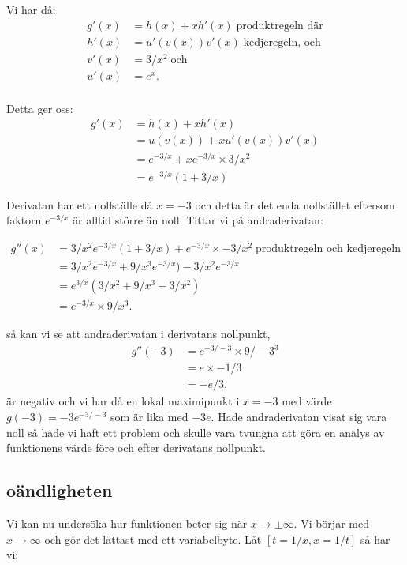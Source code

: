 \documentclass[a4paper, 11pt]{article}
\begin{document}
Vi har då:
\begin{align*}
g'(x) &= h(x) + x h'(x) \; \text{produktregeln där}\\
h'(x) &= u'(v(x)) v'(x) \; \text{kedjeregeln, och}\\
v'(x) &= 3/x^2\; \text{och}\\
u'(x) &= e^x.\\
\end{align*}

Detta ger oss:
\begin{align*}
  g'(x) & = h(x) + x h'(x)\\
  & = u(v(x)) + x u'(v(x)) v'(x) \\
  & = e^{-3/x} + x e^{-3/x}  \times 3/x^2 \\
  & = e^{-3/x}(1 + 3/x) 
\end{align*}


Derivatan har ett nollställe då $x = -3$ och detta är det enda nollstället eftersom faktorn $e^{-3/x}$ är alltid större
än noll. Tittar vi på andraderivatan:

\begin{align*}
  g''(x) &  = 3/x^2 e^{-3/x} (1 + 3/x) + e^{-3/x} \times -3/x^2 \; \text{produktregeln och kedjeregeln}\\
  & = 3/x^2 e^{-3/x} + 9/x^3 e^{-3/x})  - 3/x^2 e^{-3/x}\\
  & = e^{3/x} ( 3/x^2 +  9/x^3 - 3/x^2) \\
  & = e^{-3/x} \times  9/x^3 .
\end{align*}

så kan vi se att andraderivatan i derivatans nollpunkt,
\begin{align*}
  g''(-3) & =  e^{-3/-3} \times 9/-3^3 \\
  & = e \times -1/3 \\
  & = - e/3,
\end{align*}
är negativ och vi har då en lokal maximipunkt i $x = -3$ med värde
$g(-3) = -3 e^{-3/-3}$ som är lika med $ -3e$. Hade andraderivatan
visat sig vara noll så hade vi haft ett problem och skulle vara
tvungna att göra en analys av funktionens värde före och efter
derivatans nollpunkt.

\subsection*{oändligheten}

Vi kan nu undersöka hur funktionen beter sig när $x \rightarrow \pm
\infty$. Vi börjar med $x \rightarrow \infty$ och gör det lättast med ett
variabelbyte. Låt $[ t = 1/x, x = 1/t ]$ så har vi:
\end{document}
